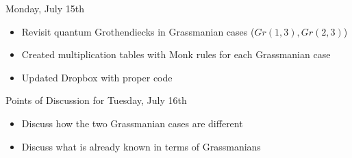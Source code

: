 Monday, July 15th
\begin{itemize}
    \item Revisit quantum Grothendiecks in Grassmanian cases ($Gr(1, 3), Gr(2, 3)$)
    \item Created multiplication tables with Monk rules for each Grassmanian case
    \item Updated Dropbox with proper code
\end{itemize}

Points of Discussion for Tuesday, July 16th
\begin{itemize}
    \item Discuss how the two Grassmanian cases are different
    \item Discuss what is already known in terms of Grassmanians
\end{itemize}